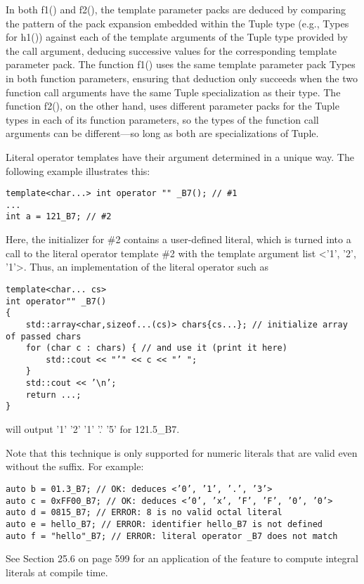 In both f1() and f2(), the template parameter packs are deduced by comparing the pattern of the pack expansion embedded within the Tuple type (e.g., Types for h1()) against each of the template arguments of the Tuple type provided by the call argument, deducing successive values for the corresponding template parameter pack. The function f1() uses the same template parameter pack Types in both function parameters, ensuring that deduction only succeeds when the two function call arguments have the same Tuple specialization as their type. The function f2(), on the other hand, uses different parameter packs for the Tuple types in each of its function parameters, so the types of the function call arguments can be different—so long as both are specializations of Tuple.


Literal operator templates have their argument determined in a unique way. The following example illustrates this:

\begin{lstlisting}[style=styleCXX]
template<char...> int operator "" _B7(); // #1
...
int a = 121_B7; // #2
\end{lstlisting}

Here, the initializer for \#2 contains a user-defined literal, which is turned into a call to the literal operator template \#2 with the template argument list <’1’, ’2’, ’1’>. Thus, an implementation of the literal operator such as

\begin{lstlisting}[style=styleCXX]
template<char... cs>
int operator"" _B7()
{
	std::array<char,sizeof...(cs)> chars{cs...}; // initialize array of passed chars
	for (char c : chars) { // and use it (print it here)
		std::cout << "’" << c << "’ ";
	}
	std::cout << ’\n’;
	return ...;
}
\end{lstlisting}

will output ’1’ ’2’ ’1’ ’.’ ’5’ for 121.5\_B7.

Note that this technique is only supported for numeric literals that are valid even without the suffix. For example:

\begin{lstlisting}[style=styleCXX]
auto b = 01.3_B7; // OK: deduces <’0’, ’1’, ’.’, ’3’>
auto c = 0xFF00_B7; // OK: deduces <’0’, ’x’, ’F’, ’F’, ’0’, ’0’>
auto d = 0815_B7; // ERROR: 8 is no valid octal literal
auto e = hello_B7; // ERROR: identifier hello_B7 is not defined
auto f = "hello"_B7; // ERROR: literal operator _B7 does not match
\end{lstlisting}

See Section 25.6 on page 599 for an application of the feature to compute integral literals at compile time.






















